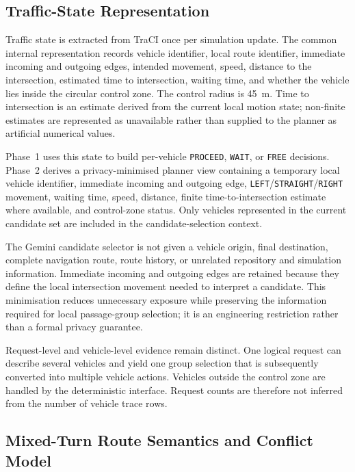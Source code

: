 \documentclass[letterpaper,10pt,conference]{ieeeconf}
\begin{document}
\subsection{Traffic-State Representation}



Traffic state is extracted from TraCI once per simulation update. The common internal representation records vehicle identifier, local route identifier, immediate incoming and outgoing edges, intended movement, speed, distance to the intersection, estimated time to intersection, waiting time, and whether the vehicle lies inside the circular control zone. The control radius is 45~m. Time to intersection is an estimate derived from the current local motion state; non-finite estimates are represented as unavailable rather than supplied to the planner as artificial numerical values.



Phase~1 uses this state to build per-vehicle \texttt{PROCEED}, \texttt{WAIT}, or \texttt{FREE} decisions. Phase~2 derives a privacy-minimised planner view containing a temporary local vehicle identifier, immediate incoming and outgoing edge, \texttt{LEFT}/\texttt{STRAIGHT}/\texttt{RIGHT} movement, waiting time, speed, distance, finite time-to-intersection estimate where available, and control-zone status. Only vehicles represented in the current candidate set are included in the candidate-selection context.



The Gemini candidate selector is not given a vehicle origin, final destination, complete navigation route, route history, or unrelated repository and simulation information. Immediate incoming and outgoing edges are retained because they define the local intersection movement needed to interpret a candidate. This minimisation reduces unnecessary exposure while preserving the information required for local passage-group selection; it is an engineering restriction rather than a formal privacy guarantee.



Request-level and vehicle-level evidence remain distinct. One logical request can describe several vehicles and yield one group selection that is subsequently converted into multiple vehicle actions. Vehicles outside the control zone are handled by the deterministic interface. Request counts are therefore not inferred from the number of vehicle trace rows.



\subsection{Mixed-Turn Route Semantics and Conflict Model}
\end{document}

